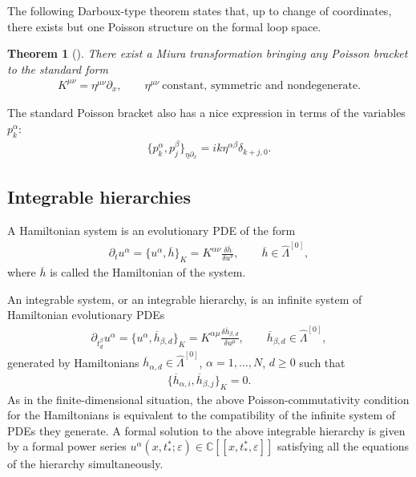 \documentclass[pdftex]{sigma}
\numberwithin{equation}{section}
\newtheorem{Theorem}{Theorem}[section]
\newcommand{\mbC}{\mathbb C}
\newcommand{\oh}{\overline h}
\newcommand{\hLambda}{\widehat\Lambda}
\def\d{{\partial}}
\newcommand{\<}{\left<}
\renewcommand{\>}{\right>}
\newcommand{\eps}{\varepsilon}
\begin{document}
The following Darboux-type theorem states that, up to change of coordinates, there exists but one Poisson structure on the formal loop space.
\begin{Theorem}[\cite{Get02}]
There exist a Miura transformation bringing any Poisson bracket to the standard form \begin{gather*}K^{\mu \nu}= \eta^{\mu\nu} \d_x, \qquad \eta^{\mu\nu}\ \text{constant, symmetric and nondegenerate}.\end{gather*}
\end{Theorem}

The standard Poisson bracket also has a nice expression in terms of the variables $p^\alpha_k$:
\begin{gather*}\big\{p^\alpha_k, p^\beta_j\big\}_{\eta \partial_x} = i k \eta^{\alpha \beta} \delta_{k+j,0}.\end{gather*}


\subsection{Integrable hierarchies} A Hamiltonian system is an evolutionary PDE of the form
\begin{gather*}\d_t u^\alpha = \big\{u^\alpha,\oh \big\}_K= K^{\alpha\nu} \frac{\delta \oh}{\delta u^\nu}, \qquad \oh\in \hLambda^{[0]},\end{gather*}
where $\oh$ is called the Hamiltonian of the system.

An integrable system, or an integrable hierarchy, is an inf\/inite system of Hamiltonian evolutionary PDEs
\begin{gather}\label{eq:intsys}
\d_{t^\beta_d} u^\alpha = \big\{u^\alpha,\oh_{\beta,d} \big\}_K=K^{\alpha\mu} \frac{\delta \oh_{\beta,d}}{\delta u^\mu},\qquad \oh_{\beta,d}\in \hLambda^{[0]},
\end{gather}
generated by Hamiltonians $\oh_{\alpha,d} \in \hLambda^{[0]}$, $\alpha=1,\dots,N$, $d\geq 0$ such that
\begin{gather*}\big\{\oh_{\alpha,i},\oh_{\beta,j}\big\}_K=0.\end{gather*}
As in the f\/inite-dimensional situation, the above Poisson-commutativity condition for the Hamiltonians is equivalent to the compatibility of the inf\/inite system of PDEs they generate. A formal solution to the above integrable hierarchy is given by a formal power series $u^\alpha(x,t^*_*;\eps) \in \mbC[[x,t^*_*,\eps]]$ satisfying all the equations of the hierarchy simultaneously.
\end{document}
